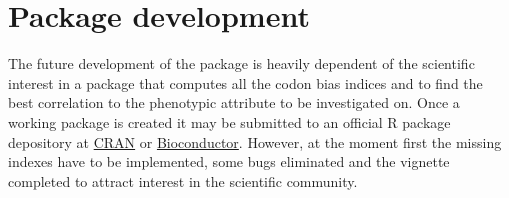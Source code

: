\section{Package development}
The future development of the package is heavily dependent of the scientific interest in a package that computes all the codon bias indices and to find the best correlation to the phenotypic attribute to be investigated on. 
Once a working package is created it may be submitted to an official R package depository at \href{https://cran.r-project.org/doc/manuals/r-release/R-exts.html}{CRAN} or \href{https://www.bioconductor.org/developers/how-to/buildingPackagesForBioc/}{Bioconductor}. However, at the moment first the missing indexes have to be implemented, some bugs eliminated and the vignette completed to attract interest in the scientific community.

